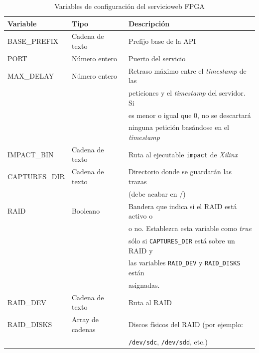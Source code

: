 \begin{table}
\centering
\begin{tabular}{|l|l|l|}
\hline
\rowcolor[HTML]{F5F5F5}
\textbf{Variable}   & \textbf{Tipo}    & \textbf{Descripción}                                           \\ \hline
BASE\_PREFIX        & Cadena de texto  & Prefijo base de la \gls{API}                                   \\ \hline
PORT                & Número entero    & Puerto del servicio                                            \\ \hline
MAX\_DELAY          & Número entero    & Retraso máximo entre el \textit{timestamp} de las              \\
                    &                  & peticiones y el \textit{timestamp} del servidor. Si            \\
                    &                  & es menor o igual que 0, no se descartará                       \\ 
                    &                  & ninguna petición basándose en el \textit{timestamp}            \\ \hline
IMPACT\_BIN         & Cadena de texto  & Ruta al ejecutable \texttt{impact} de \textit{Xilinx}          \\ \hline
CAPTURES\_DIR       & Cadena de texto  & Directorio donde se guardarán las \glspl{traza}                \\
                    &                  & (debe acabar en /)                                             \\ \hline
RAID                & Booleano         & Bandera que indica si el \gls{RAID} está activo o              \\
                    &                  & o no. Establezca esta variable como \textit{true}              \\
                    &                  & sólo si \texttt{CAPTURES\_DIR} está sobre un \gls{RAID} y      \\
                    &                  & las variables \texttt{RAID\_DEV} y \texttt{RAID\_DISKS} están  \\
                    &                  & asignadas.                                                     \\ \hline
RAID\_DEV           & Cadena de texto  & Ruta al \gls{RAID}                                             \\ \hline
RAID\_DISKS         & Array de cadenas & Discos físicos del \gls{RAID} (por ejemplo:                    \\
                    &                  & \texttt{/dev/sdc}, \texttt{/dev/sdd}, etc.)                    \\ \hline
\end{tabular}
\caption{Variables de configuración del \gls{servicioweb} \gls{FPGA}}
\label{extra:manual:paramsfpga}
\end{table}



